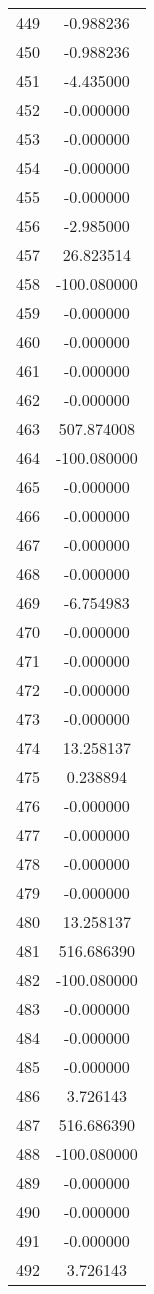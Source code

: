 \documentclass[12pt]{article}
\begin{document}
\begin{longtable}{@{}cc@{}}
449 & -0.988236 \\
450 & -0.988236 \\
451 & -4.435000 \\
452 & -0.000000 \\
453 & -0.000000 \\
454 & -0.000000 \\
455 & -0.000000 \\
456 & -2.985000 \\
457 & 26.823514 \\
458 & -100.080000 \\
459 & -0.000000 \\
460 & -0.000000 \\
461 & -0.000000 \\
462 & -0.000000 \\
463 & 507.874008 \\
464 & -100.080000 \\
465 & -0.000000 \\
466 & -0.000000 \\
467 & -0.000000 \\
468 & -0.000000 \\
469 & -6.754983 \\
470 & -0.000000 \\
471 & -0.000000 \\
472 & -0.000000 \\
473 & -0.000000 \\
474 & 13.258137 \\
475 & 0.238894 \\
476 & -0.000000 \\
477 & -0.000000 \\
478 & -0.000000 \\
479 & -0.000000 \\
480 & 13.258137 \\
481 & 516.686390 \\
482 & -100.080000 \\
483 & -0.000000 \\
484 & -0.000000 \\
485 & -0.000000 \\
486 & 3.726143 \\
487 & 516.686390 \\
488 & -100.080000 \\
489 & -0.000000 \\
490 & -0.000000 \\
491 & -0.000000 \\
492 & 3.726143 \\

\end{longtable}
\end{document}
